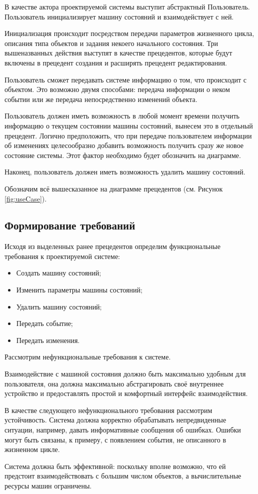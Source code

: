 \documentclass[a4paper,10pt]{article}
\begin{document}
В качестве актора проектируемой системы выступит абстрактный Пользователь.
Пользователь инициализирует машину состояний и взаимодействует с ней.

Инициализация происходит посредством передачи параметров жизненного цикла,
описания типа объектов и задания некоего начального состояния. Три вышеназванных
действия выступят в качестве прецедентов, которые будут включены в прецедент создания
и расширять прецедент редактирования.

Пользователь сможет передавать системе информацию о том, что происходит с объектом.
Это возможно двумя способами: передача информации о неком событии или же передача
непосредственно изменений объекта.

Пользователь должен иметь возможность в любой момент времени получить информацию
о текущем состоянии машины состояний, вынесем это в отдельный прецедент. Логично
предположить, что при передаче пользователем информации об изменениях целесообразно
добавить возможность получить сразу же новое состояние системы. Этот фактор необходимо
будет обозначить на диаграмме.

Наконец, пользователь должен иметь возможность удалить машину состояний.

Обозначим всё вышесказанное на диаграмме прецедентов (см. Рисунок \ref{fig:useCase}).

\subsection{Формирование требований}

Исходя из выделенных ранее прецедентов определим функциональные требования к
проектируемой системе:

\begin{itemize}
    \item Создать машину состояний;
    \item Изменить параметры машины состояний;
    \item Удалить машину состояний;
    \item Передать событие;
    \item Передать изменения.
\end{itemize}

Рассмотрим нефункциональные требования к системе.

Взаимодействие с машиной состояния должно быть максимально удобным для пользователя,
она должна максимально абстрагировать своё внутреннее устройство и предоставлять
простой и комфортный интерфейс взаимодействия.

В качестве следующего нефункционального требования рассмотрим устойчивость.
Система должна корректно обрабатывать непредвиденные ситуации, например,
давать информативные сообщения об ошибках. Ошибки могут быть связаны, к примеру,
с появлением события, не описанного в жизненном цикле.

Система должна быть эффективной: поскольку вполне возможно, что ей предстоит
взаимодействовать с большим числом объектов, а вычислительные ресурсы машин ограничены.
\end{document}
